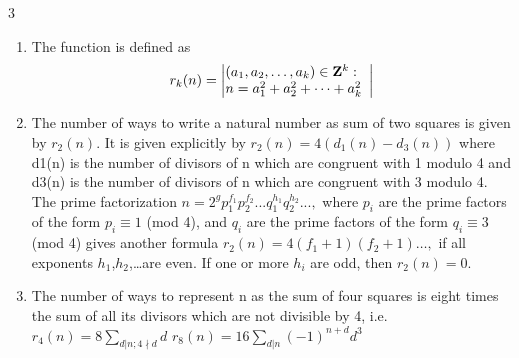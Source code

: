 \documentclass[8pt,a4paper,onesided]{article}
\begin{document}
\begin{multicols}{3}
\begin{enumerate}[resume]
    \item The function is defined as
    \[
r_k(n)
=
\left|
\begin{array}{@{}l}
(a_1,a_2,\dots,a_k) \in \mathbf{Z}^k : \\
n = a_1^2 + a_2^2 + \dots + a_k^2
\end{array}
\right|
\]
    \item The number of ways to write a natural number as sum of two squares is given by $r_2(n)$. It is given explicitly by
    $r_{2}\left(n\right) = 4\left(d_{1}\left(n\right) - d_{3}\left(n\right)\right)$
    where d1(n) is the number of divisors of n which are congruent with 1 modulo 4 and d3(n) is the number of divisors of n which are congruent with 3 modulo 4.
    The prime factorization $n = 2^{g}p_{1}^{f_{1}}p_{2}^{f_{2}}. . .q_{1}^{h_{1}}q_{2}^{h_{2}}. . . ,$ where $\displaystyle p_{i}$ are the prime factors of the form $\displaystyle p_{i} \equiv 1$ (mod 4), and $q_{i}$ are the prime factors of the form $q_{i} \equiv 3$ (mod 4) gives another formula $r_{2}\left(n\right) = 4\left(f_{1}+1\right)\left(f_{2}+1\right)\dots,$ if all exponents $h_{1}$,$h_{2}$,\dots are even. If one or more $h_{i}$ are odd, then $r_{2}\left(n\right) = 0.$
    \item The number of ways to represent n as the sum of four squares is eight times the sum of all its divisors which are not divisible by 4, i.e.
    $r_{4}\left( n \right) = 8 \displaystyle\sum _{d| n;4 \nmid d}d$
    $r_{8}\left(n\right) = 16 \displaystyle\sum _{d|n} \left(-1\right)^{n+d}d^{3}$
\end{enumerate}

\end{multicols}
\end{document}
